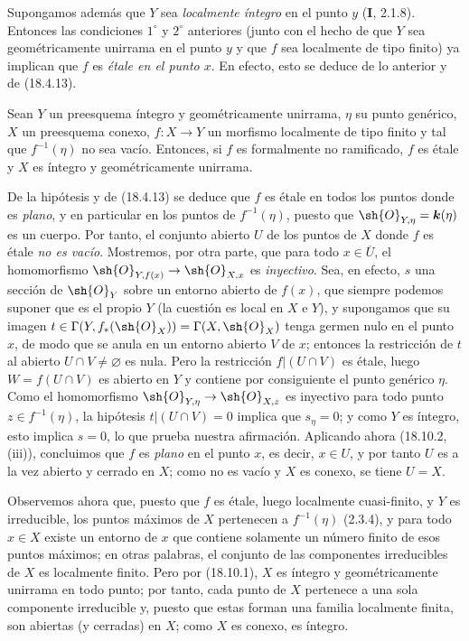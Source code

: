 \begin{remark}[18.10.2]
\begin{enumerate}
Supongamos además que $Y$ sea \emph{localmente íntegro} en el punto $y$ (\textbf I, 2.1.8). Entonces las condiciones $1^\circ$ y $2^\circ$ anteriores (junto con el hecho de que $Y$ sea geométricamente unirrama en el punto $y$ y que $f$ sea localmente de tipo finito) ya implican que $f$ es \emph{étale en el punto $x$}. En efecto, esto se deduce de lo anterior y de (18.4.13).
\end{enumerate}
\end{remark}

\begin{corollary}[18.10.3]
\label{IV.18.10.3}
Sean $Y$ un preesquema íntegro y geométricamente unirrama, $\eta$ su punto genérico, $X$ un preesquema conexo, $f:X\to Y$ un morfismo localmente de tipo finito y tal que $f^{-1}(\eta)$ no sea vacío. Entonces, si $f$ es formalmente no ramificado, $f$ es étale y $X$ es íntegro y geométricamente unirrama.
\end{corollary}

De la hipótesis y de (18.4.13) se deduce que $f$ es étale en todos los puntos donde es \emph{plano}, y en particular en los puntos de $f^{-1}(\eta)$, puesto que $\sh{O}_{Y,\eta}=\boldsymbol k(\eta)$ es un cuerpo. Por tanto, el conjunto abierto $U$ de los puntos de $X$ donde $f$ es étale \emph{no es vacío}. Mostremos, por otra parte, que para todo $x\in\overline U$, el homomorfismo $\sh{O}_{Y,f(x)}\to\sh{O}_{X,x}$ es \emph{inyectivo}. Sea, en efecto, $s$ una sección de $\sh{O}_Y$ sobre un entorno abierto de $f(x)$, que siempre podemos suponer que es el propio $Y$ (la cuestión es local en $X$ e $Y$), y supongamos que su imagen $t\in\Gamma(Y,f_*(\sh{O}_X))=\Gamma(X,\sh{O}_X)$ tenga germen nulo en el punto $x$, de modo que se anula en un entorno abierto $V$ de $x$; entonces la restricción de $t$ al abierto $U\cap V\neq\varnothing$ es nula. Pero la restricción $f|(U\cap V)$ es étale, luego $W=f(U\cap V)$ es abierto en $Y$ y contiene por consiguiente el punto genérico $\eta$. Como el homomorfismo $\sh{O}_{Y,\eta}\to\sh{O}_{X,z}$ es inyectivo para todo punto $z\in f^{-1}(\eta)$, la hipótesis $t|(U\cap V)=0$ implica que $s_\eta=0$; y como $Y$ es íntegro, esto implica $s=0$, lo que prueba nuestra afirmación. Aplicando ahora (18.10.2, (iii)), concluimos que $f$ es \emph{plano} en el punto $x$, es decir, $x\in U$, y por tanto $U$ es a la vez abierto y cerrado en $X$; como no es vacío y $X$ es conexo, se tiene $U=X$.

Observemos ahora que, puesto que $f$ es étale, luego localmente cuasi-finito, y $Y$ es irreducible, los puntos máximos de $X$ pertenecen a $f^{-1}(\eta)$ (2.3.4), y para todo $x\in X$ existe un entorno de $x$ que contiene solamente un número finito de esos puntos máximos; en otras palabras, el conjunto de las componentes irreducibles de $X$ es localmente finito. Pero por (18.10.1), $X$ es íntegro y geométricamente unirrama en todo punto; por tanto, cada punto de $X$ pertenece a una sola componente irreducible y, puesto que estas forman una familia localmente finita, son abiertas (y cerradas) en $X$; como $X$ es conexo, es íntegro.

